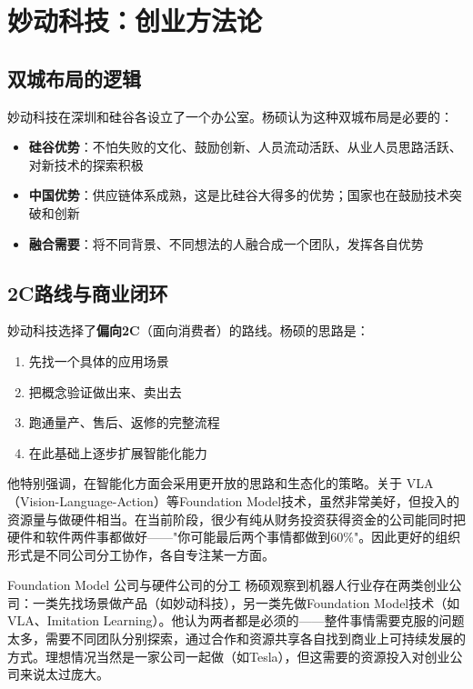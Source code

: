 \section{妙动科技：创业方法论}

\subsection{双城布局的逻辑}

妙动科技在深圳和硅谷各设立了一个办公室。杨硕认为这种双城布局是必要的：

\begin{itemize}
    \item \textbf{硅谷优势}：不怕失败的文化、鼓励创新、人员流动活跃、从业人员思路活跃、对新技术的探索积极
    \item \textbf{中国优势}：供应链体系成熟，这是比硅谷大得多的优势；国家也在鼓励技术突破和创新
    \item \textbf{融合需要}：将不同背景、不同想法的人融合成一个团队，发挥各自优势
\end{itemize}

\subsection{2C路线与商业闭环}

妙动科技选择了\textbf{偏向2C}（面向消费者）的路线。杨硕的思路是：

\begin{enumerate}
    \item 先找一个具体的应用场景
    \item 把概念验证做出来、卖出去
    \item 跑通量产、售后、返修的完整流程
    \item 在此基础上逐步扩展智能化能力
\end{enumerate}

他特别强调，在智能化方面会采用更开放的思路和生态化的策略。关于 VLA（Vision-Language-Action）等Foundation Model技术，虽然非常美好，但投入的资源量与做硬件相当。在当前阶段，很少有纯从财务投资获得资金的公司能同时把硬件和软件两件事都做好——"你可能最后两个事情都做到60\%"。因此更好的组织形式是不同公司分工协作，各自专注某一方面。

\begin{knowledgebox}{Foundation Model 公司与硬件公司的分工}
杨硕观察到机器人行业存在两类创业公司：一类先找场景做产品（如妙动科技），另一类先做Foundation Model技术（如VLA、Imitation Learning）。他认为两者都是必须的——整件事情需要克服的问题太多，需要不同团队分别探索，通过合作和资源共享各自找到商业上可持续发展的方式。理想情况当然是一家公司一起做（如Tesla），但这需要的资源投入对创业公司来说太过庞大。
\end{knowledgebox}

